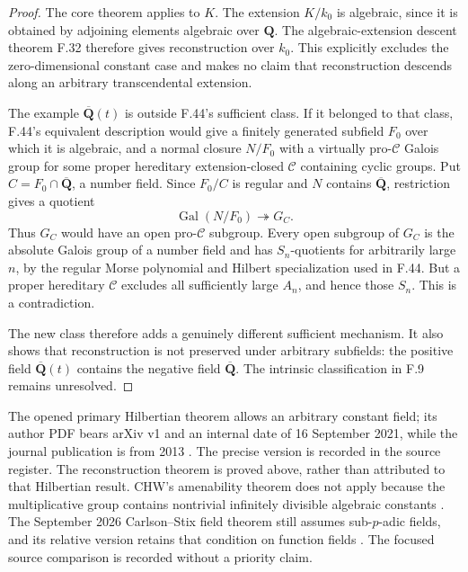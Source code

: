 \begin{proof}
The core theorem applies to \(K\). The extension \(K/k_0\) is algebraic,
since it is obtained by adjoining elements algebraic over \(\mathbf Q\).
The algebraic-extension descent theorem F.32 therefore gives
reconstruction over \(k_0\). This explicitly excludes the zero-dimensional
constant case and makes no claim that reconstruction descends along an
arbitrary transcendental extension.


The example \(\overline{\mathbf Q}(t)\) is outside F.44's sufficient
class. If it belonged to that class, F.44's equivalent description would
give a finitely generated subfield \(F_0\) over which it is algebraic,
and a normal closure \(N/F_0\) with a virtually pro-\(\mathcal C\)
Galois group for some proper hereditary extension-closed
\(\mathcal C\) containing cyclic groups. Put
\(C=F_0\cap\overline{\mathbf Q}\), a number field. Since \(F_0/C\)
is regular and \(N\) contains \(\overline{\mathbf Q}\), restriction
gives a quotient
\[
              \operatorname{Gal}(N/F_0)\twoheadrightarrow G_C.
\]
Thus \(G_C\) would have an open pro-\(\mathcal C\) subgroup. Every
open subgroup of \(G_C\) is the absolute Galois group of a number field
and has \(S_n\)-quotients for arbitrarily large \(n\), by the regular
Morse polynomial and Hilbert specialization used in F.44. But a proper
hereditary \(\mathcal C\) excludes all sufficiently large \(A_n\),
and hence those \(S_n\). This is a contradiction.

The new class therefore adds a genuinely different sufficient
mechanism. It also shows that reconstruction is not preserved under
arbitrary subfields: the positive field \(\overline{\mathbf Q}(t)\)
contains the negative field \(\overline{\mathbf Q}\). The intrinsic
classification in F.9 remains unresolved.


\end{proof}

The opened primary Hilbertian theorem allows an arbitrary constant field;
its author PDF bears arXiv v1 and an internal date of 16 September 2021,
while the journal publication is from 2013
\citep{F_BarySorokerParan2013}. The precise version is recorded in the
source register. The reconstruction theorem is proved above, rather
than attributed to that Hilbertian result. CHW's amenability theorem
does not apply because the multiplicative group contains nontrivial
infinitely divisible algebraic constants
\citep[Theorem~0.3]{F_CHW2024}. The September 2026 Carlson--Stix field
theorem still assumes sub-$p$-adic fields, and its relative version
retains that condition on function fields \citep{F_CS2026}.
The focused source comparison is recorded without a priority claim.
